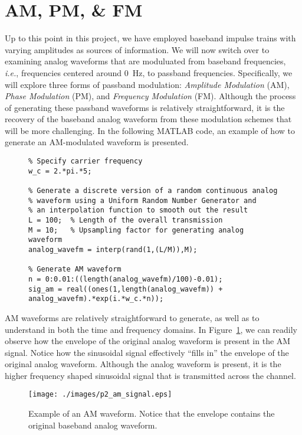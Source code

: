 \documentclass[letterpaper,12pt]{article}
\begin{document}
\section{AM, PM, \& FM}

Up to this point in this project, we have employed baseband impulse trains with varying amplitudes as sources of information.  We will now switch over to examining analog waveforms that are moduluated from baseband frequencies,
\textit{i.e.}, frequencies centered around 0~Hz, to passband frequencies.  Specifically, we will explore three forms of passband modulation: \textit{Amplitude Modulation} (AM), \textit{Phase Modulation} (PM), and \textit{Frequency Modulation} (FM).
Although the process of generating these passband waveforms is relatively straightforward, it is the recovery of the baseband analog waveform from these modulation schemes that will be more challenging. In the following MATLAB code,
an example of how to generate an AM-modulated waveform is presented.
\begin{figure}[h]
\centering
\begin{minipage}[framed]{0.9\textwidth}
\begin{lstlisting}
% Specify carrier frequency
w_c = 2.*pi.*5; 

% Generate a discrete version of a random continuous analog
% waveform using a Uniform Random Number Generator and
% an interpolation function to smooth out the result
L = 100;  % Length of the overall transmission
M = 10;   % Upsampling factor for generating analog waveform
analog_wavefm = interp(rand(1,(L/M)),M);

% Generate AM waveform
n = 0:0.01:((length(analog_wavefm)/100)-0.01);
sig_am = real((ones(1,length(analog_wavefm)) + analog_wavefm).*exp(i.*w_c.*n));
\end{lstlisting}
\end{minipage}
\captionsetup{labelformat=empty}
\end{figure}

AM waveforms are relatively straightforward to generate, as well as to understand in both the time and frequency domains.  In Figure~\ref{f:p2_am}, we can readily observe how the envelope of the original analog waveform 
is present in the AM signal.  Notice how the sinusoidal signal effectively ``fills in'' the envelope of the original analog waveform.  Although the analog waveform is present, it is the higher frequency shaped sinusoidal signal
that is transmitted across the channel.
\begin{figure}[h]
 \centering
 \texttt{[image: ./images/p2\_am\_signal.eps]}
 \caption{Example of an AM waveform.  Notice that the envelope contains the original baseband analog waveform.}\label{f:p2_am}
\end{figure}
\end{document}
